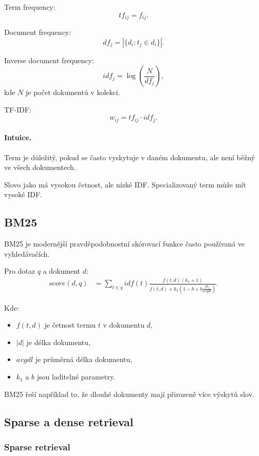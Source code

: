 Term frequency:
\[
tf_{ij}=f_{ij}.
\]

Document frequency:
\[
df_j
=
|\{d_i:t_j\in d_i\}|.
\]

Inverse document frequency:
\[
idf_j
=
\log\left(\frac{N}{df_j}\right),
\]
kde $N$ je počet dokumentů v kolekci.

TF-IDF:
\[
w_{ij}
=
tf_{ij}\cdot idf_j.
\]

\paragraph{Intuice.}
Term je důležitý, pokud se často vyskytuje v daném dokumentu, ale není běžný ve všech dokumentech.

Slovo jako  má vysokou četnost, ale nízké IDF. Specializovaný term může mít vysoké IDF.

\subsection{BM25}

BM25 je modernější pravděpodobnostní skórovací funkce často používaná ve vyhledávačích.

Pro dotaz $q$ a dokument $d$:
\[
\begin{aligned}
score(d,q)
&=
\sum_{t\in q}
idf(t)
\frac{
f(t,d)(k_1+1)
}{
f(t,d)+k_1\left(1-b+b\frac{|d|}{avgdl}\right)
}.
\end{aligned}
\]

Kde:
\begin{itemize}
    \item $f(t,d)$ je četnost termu $t$ v dokumentu $d$,
    \item $|d|$ je délka dokumentu,
    \item $avgdl$ je průměrná délka dokumentu,
    \item $k_1$ a $b$ jsou laditelné parametry.
\end{itemize}

BM25 řeší například to, že dlouhé dokumenty mají přirozeně více výskytů slov.

\subsection{Sparse a dense retrieval}

\subsubsection{Sparse retrieval}

